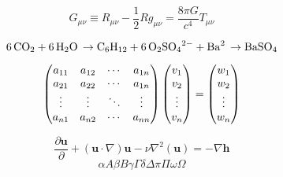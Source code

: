 \documentclass{article}
\begin{document}
\begin{center}
\[
G_{\mu\nu} \equiv R_{\mu\nu}  - \frac{1}{2}Rg_{\mu\nu}  = \frac{8\pi G}{c^4}T_{\mu\nu} 
\]

\[
\ce {6CO2 + 6H2O \rightarrow C6H12 + 6O2}\\
\ce{SO4^2- + Ba^2 \rightarrow BaSO4}
\]

\[
\begin{pmatrix}
a_{11} & a_{12} & \cdots & a_{1n} \\
a_{21} & a_{22} & \cdots & a_{1n} \\
\vdots & \vdots & \ddots & \vdots \\
a_{n1} & a_{n2} & \cdots & a_{nn} \\
\end{pmatrix}
\left(\begin{array}{@{}c@{}}
    v_{1} \\
    v_{2} \\
    \vdots \\
    v_{n} 
    \end{array} \right)
= 
\left(\begin{matrix}
w_{1} \\
w_{2} \\
\vdots \\
w_{n}
\end{matrix} \right)
\]

\[
\frac{\partial\textbf{u}}{\partial} + \left(\textbf{u}  \cdot \nabla \right)\textbf{u}  - \nu \nabla ^2  \left(\textbf{u} \right) = - \nabla\textbf{h}
\]
\[\alpha A \beta B \gamma \Gamma \delta\Delta\pi	\Pi\omega\Omega\]
\end{center}
\end{document}
